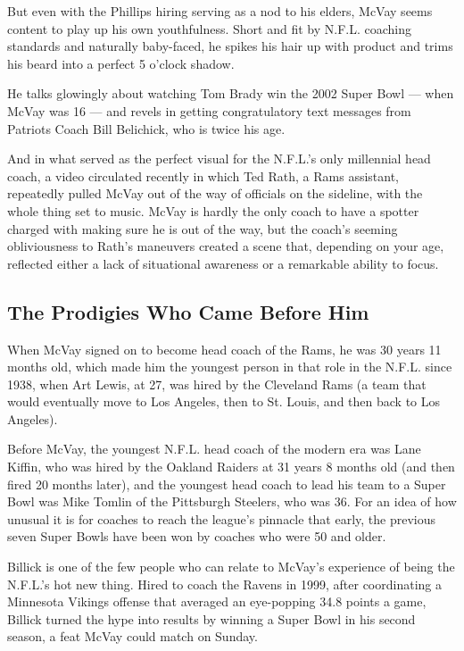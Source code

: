 But even with the Phillips hiring serving as a nod to his elders, McVay
seems content to play up his own youthfulness. Short and fit by N.F.L.
coaching standards and naturally baby-faced, he spikes his hair up with
product and trims his beard into a perfect 5 o'clock shadow.

He talks glowingly about watching Tom Brady win the 2002 Super Bowl ---
when McVay was 16 --- and revels in getting congratulatory text messages
from Patriots Coach Bill Belichick, who is twice his age.

And in what served as the perfect visual for the N.F.L.'s only
millennial head coach, a video circulated recently in which Ted Rath, a
Rams assistant, repeatedly pulled McVay out of the way of officials on
the sideline, with the whole thing set to music. McVay is hardly the
only coach to have a spotter charged with making sure he is out of the
way, but the coach's seeming obliviousness to Rath's maneuvers created a
scene that, depending on your age, reflected either a lack of
situational awareness or a remarkable ability to focus.

\hypertarget{the-prodigies-who-came-before-him}{%
\subsection{The Prodigies Who Came Before
Him}\label{the-prodigies-who-came-before-him}}

When McVay signed on to become head coach of the Rams, he was 30 years
11 months old, which made him the youngest person in that role in the
N.F.L. since 1938, when Art Lewis, at 27, was hired by the Cleveland
Rams (a team that would eventually move to Los Angeles, then to St.
Louis, and then back to Los Angeles).

Before McVay, the youngest N.F.L. head coach of the modern era was Lane
Kiffin, who was hired by the Oakland Raiders at 31 years 8 months old
(and then fired 20 months later), and the youngest head coach to lead
his team to a Super Bowl was Mike Tomlin of the Pittsburgh Steelers, who
was 36. For an idea of how unusual it is for coaches to reach the
league's pinnacle that early, the previous seven Super Bowls have been
won by coaches who were 50 and older.

Billick is one of the few people who can relate to McVay's experience of
being the N.F.L.'s hot new thing. Hired to coach the Ravens in 1999,
after coordinating a Minnesota Vikings offense that averaged an
eye-popping 34.8 points a game, Billick turned the hype into results by
winning a Super Bowl in his second season, a feat McVay could match on
Sunday.

